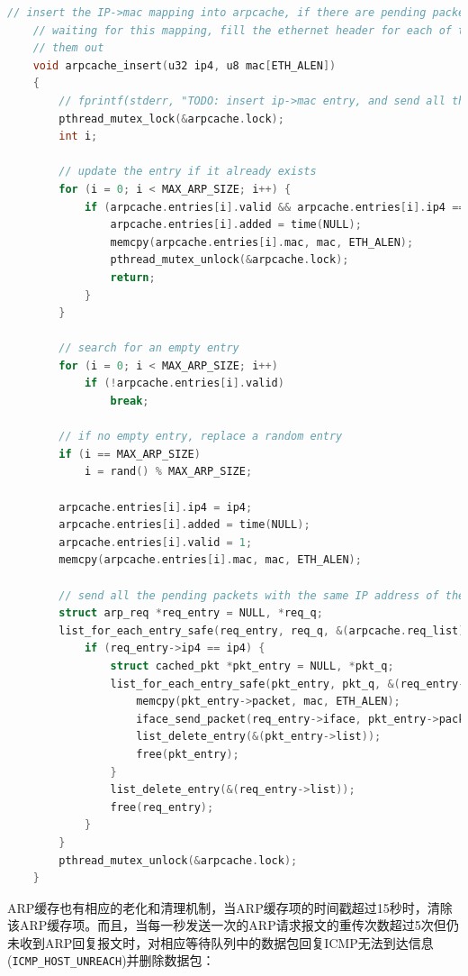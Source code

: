 \documentclass[UTF8]{report}
\begin{document}
\begin{lstlisting}[language=C]
    // insert the IP->mac mapping into arpcache, if there are pending packets
    // waiting for this mapping, fill the ethernet header for each of them, and send
    // them out
    void arpcache_insert(u32 ip4, u8 mac[ETH_ALEN])
    {
        // fprintf(stderr, "TODO: insert ip->mac entry, and send all the pending packets.\n");
        pthread_mutex_lock(&arpcache.lock);
        int i;
    
        // update the entry if it already exists
        for (i = 0; i < MAX_ARP_SIZE; i++) {
            if (arpcache.entries[i].valid && arpcache.entries[i].ip4 == ip4){
                arpcache.entries[i].added = time(NULL);
                memcpy(arpcache.entries[i].mac, mac, ETH_ALEN);
                pthread_mutex_unlock(&arpcache.lock);
                return;
            }
        }
    
        // search for an empty entry
        for (i = 0; i < MAX_ARP_SIZE; i++) 
            if (!arpcache.entries[i].valid) 
                break;
        
        // if no empty entry, replace a random entry
        if (i == MAX_ARP_SIZE)
            i = rand() % MAX_ARP_SIZE;
    
        arpcache.entries[i].ip4 = ip4;
        arpcache.entries[i].added = time(NULL);
        arpcache.entries[i].valid = 1;
        memcpy(arpcache.entries[i].mac, mac, ETH_ALEN);
    
        // send all the pending packets with the same IP address of the new entry
        struct arp_req *req_entry = NULL, *req_q;
        list_for_each_entry_safe(req_entry, req_q, &(arpcache.req_list), list) {
            if (req_entry->ip4 == ip4) {
                struct cached_pkt *pkt_entry = NULL, *pkt_q;
                list_for_each_entry_safe(pkt_entry, pkt_q, &(req_entry->cached_packets), list) {
                    memcpy(pkt_entry->packet, mac, ETH_ALEN);
                    iface_send_packet(req_entry->iface, pkt_entry->packet, pkt_entry->len);
                    list_delete_entry(&(pkt_entry->list));
                    free(pkt_entry);
                }
                list_delete_entry(&(req_entry->list));
                free(req_entry);
            }
        }
        pthread_mutex_unlock(&arpcache.lock);
    }
\end{lstlisting}

ARP缓存也有相应的老化和清理机制，当ARP缓存项的时间戳超过15秒时，清除该ARP缓存项。而且，当每一秒发送一次的ARP请求报文的重传次数超过5次但仍未收到ARP回复报文时，对相应等待队列中的数据包回复ICMP无法到达信息(\texttt{ICMP_HOST_UNREACH})并删除数据包：
\end{document}
